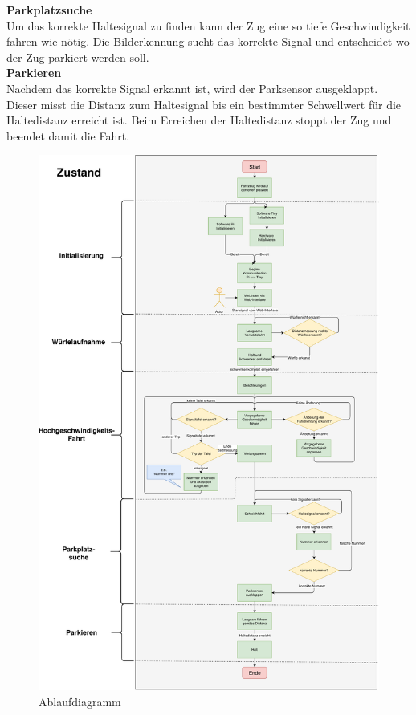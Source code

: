 \documentclass[../../main.tex]{subfiles}
\begin{document}
    \textbf{Parkplatzsuche}\\
    Um das korrekte Haltesignal zu finden kann der Zug eine so tiefe Geschwindigkeit fahren wie nötig. Die Bilderkennung sucht das korrekte Signal und entscheidet wo der Zug parkiert werden soll.\\

    \textbf{Parkieren}\\
    Nachdem das korrekte Signal erkannt ist, wird der Parksensor ausgeklappt. Dieser misst die Distanz zum Haltesignal bis ein bestimmter Schwellwert für die Haltedistanz erreicht ist. Beim Erreichen der Haltedistanz stoppt der Zug und beendet damit die Fahrt.

    \begin{figure}[H]
        \centering
        \includegraphics[width=1.0\textwidth]{Ablaufdiagramm.pdf}
        \caption {Ablaufdiagramm}
        \label{fig:Ablaufdiagramm}
    \end{figure}

    
\end{document}
